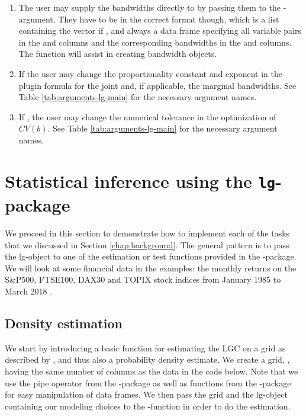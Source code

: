 \begin{enumerate}
\def\labelenumi{\arabic{enumi}.}
\item
  The user may supply the bandwidths directly to  by passing them to the -argument. They have to be in the   correct format though, which is a list containing the vector  if , and always a data frame  specifying all variable pairs in the  and  columns and the corresponding bandwidths
  in the  and  columns. The function  will assist in creating bandwidth objects.
\item
  If  the user may change the proportionality constant and exponent in the plugin formula for the joint and, if applicable, the marginal bandwidths. See Table \ref{tab:arguments-lg-main} for the necessary argument names.
\item
  If , the user may change the numerical tolerance in the optimization of \(CV(b)\). See Table \ref{tab:arguments-lg-main} for the necessary argument names.
\end{enumerate}

\section{Statistical inference using the \texttt{lg}-package}
\label{chap:inference}

We proceed in this section to demonstrate how to implement each of the tasks that we discussed in Section \ref{chap:background}. The general pattern is to pass the lg-object to one of the estimation or test functions provided in the -package. We will look at some financial data in the examples: the monthly returns on the S\&P500, FTSE100, DAX30 and TOPIX stock indices from January 1985 to March 2018 \citep{datastream}. 

\subsection{Density estimation}\label{chap:density}

We start by introducing a basic function for estimating the LGC on a grid as described by \citet{otne:tjos:2017}, and thus also a probability density estimate. We create a grid, , having the same number of columns as the data in the code below. Note that we use the pipe operator \code{\%\textgreater{}\%} from the -package \citep{bach:wick:2014} as well as functions from the -package \citep{wick:fran:mull:2018} for easy manipulation of data frames. We then pass the grid and the lg-object containing our modeling choices to the -function in order to do the estimation.


